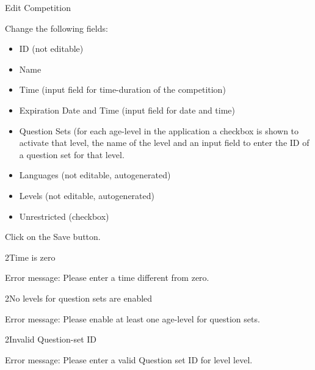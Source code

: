 
\begin{uc}{Edit Competition}


    \begin{uc-mss}
    \item Change the following fields:
    	\begin{itemize}
			\item ID (not editable)
			\item Name
			\item Time (input field for time-duration of the competition)
			\item Expiration Date and Time (input field for date and time)
			\item Question Sets (for each age-level in the application a checkbox is shown
			to activate that level, the name of the level and an input field to enter the
			ID of a question set for that level.
			\item Languages (not editable, autogenerated)
			\item Levels (not editable, autogenerated)
			\item Unrestricted (checkbox)
		\end{itemize}
    \item Click on the Save button.
    \end{uc-mss}

    \begin{uc-ext}

        \begin{uc-fail}{2}{Time is zero}
        \item Error message: Please enter a time different from zero.
        \end{uc-fail}

		\begin{uc-fail}{2}{No levels for question sets are enabled}
        \item Error message: Please enable at least one age-level for question sets.
        \end{uc-fail}
        
        \begin{uc-fail}{2}{Invalid Question-set ID}
        \item Error message: Please enter a valid Question set ID for level {level}.
        \end{uc-fail}

    \end{uc-ext}


\end{uc}
